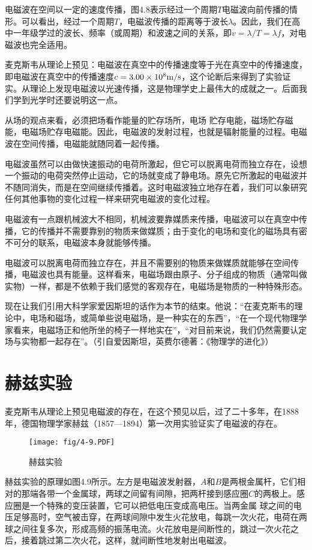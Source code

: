电磁波在空间以一定的速度传播，图4.8表示经过一个周期$T$电磁波向前传播的情形。可以看出，经过一个周期$T$，电磁波传播的距离等于波长$\lambda$。因此，我们在高中一年级学过的波长、频率（或周期）和波速之间的关系，即$v=\lambda/T=\lambda f$，对电磁波也完全适用。

麦克斯韦从理论上预见：电磁波在真空中的传播速度等于光在真空中的传播速度，即电磁波在真空中的传播速度$c=3.00\times10^8\text{m}/\text{s}$，这个论断后来得到了实验证实。从理论上发现电磁波以光速传播，这是物理学史上最伟大的成就之一。后面我们学到光学时还要说明这一点。

从场的观点来看，必须把场看作能量的贮存场所，电场
贮存电能，磁场贮存磁能，电磁场贮存电磁能。因此，电磁波的发射过程，也就是辐射能量的过程。电磁波在空间传播，电磁能就随同着一起传播。

电磁波虽然可以由做快速振动的电荷所激起，但它可以脱离电荷而独立存在，设想一个振动的电荷突然停止运动，它的场就变成了静电场。原先它所激起的电磁波并不随同消失，而是在空间继续传播着。这时电磁波独立地存在着，我们可以象研究任何其他事物的变化过程一样来研究电磁波的变化过程。

电磁波有一点跟机械波大不相同，机械波要靠媒质来传播，电磁波可以在真空中传播，它的传播并不需要靠别的物质来做媒质；由于变化的电场和变化的磁场具有密不可分的联系，电磁波本身就能够传播。

电磁波可以脱离电荷而独立存在，并且不需要别的物质来做媒质就能够在空间传播，电磁波也具有能量。这样看来，电磁场跟由原子、分子组成的物质（通常叫做实物）一样，都是不依赖于我们感觉的客观存在，电磁场是物质的一种特殊形态。

现在让我们引用大科学家爱因斯坦的话作为本节的结束。他说：“在麦克斯韦的理论中，电场和磁场，或简单些说电磁场，是一种实在的东西”，“在一个现代物理学家看来，电磁场正和他所坐的椅子一样地实在”，“对目前来说，我们仍然需要认定场与实物都一起存在”。（引自爱因斯坦，英费尔德著：《物理学的进化》）

\section{赫兹实验}
麦克斯韦从理论上预见电磁波的存在，在这个预见以后，过了二十多年，在1888年，德国物理学家赫兹（1857—1894）第一次用实验证实了电磁波的存在。

\begin{figure}[htp]\centering
	\texttt{[image: fig/4-9.PDF]}
	\caption{赫兹实验}
	\end{figure}

赫兹实验的原理如图4.9所示。左方是电磁波发射器，$A$和$B$是两根金属杆，它们相对的那端各带一个金属球，两球之间留有间隙，把两杆接到感应圈$C$的两极上。感应圈是一个特殊的变压装置，它可以把低电压变成高电压。当两金属
球之间的电压足够高时，空气被击穿，在两球间隙中发生火花放电，每跳一次火花，电荷在两球之间往复多次，形成高频的振荡电流。火花放电是间断性的，跳过一次火花之后，接着跳过第二次火花，这样，就间断性地发射出电磁波。

